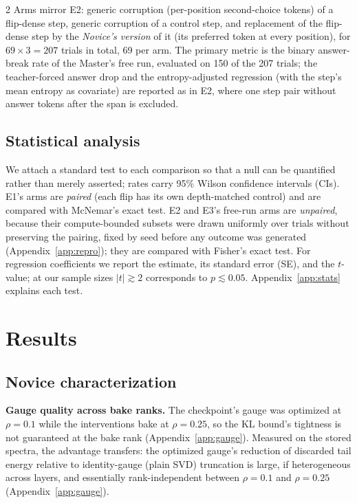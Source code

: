 \documentclass[9pt]{article}
\begin{document}
\begin{multicols}{2}
Arms mirror E2: generic
corruption (per-position second-choice tokens) of a flip-dense step, generic
corruption of a control step, and replacement of the flip-dense step by the
\emph{Novice's version} of it (its preferred token at every position), for
$69 \times 3 = 207$ trials in total, 69 per arm. The primary metric is the
binary answer-break rate of the Master's free run, evaluated on 150 of the
207 trials; the teacher-forced answer drop and the entropy-adjusted
regression (with the step's mean entropy as covariate) are reported as in E2,
where one step pair without answer tokens after the span is excluded.

\subsection{Statistical analysis}

We attach a standard test to each comparison so that a null can be
quantified rather than merely asserted; rates carry 95\% Wilson confidence
intervals (CIs). E1's arms are \emph{paired} (each flip has its own
depth-matched control) and are compared with McNemar's exact test. E2 and
E3's free-run arms are \emph{unpaired}, because their compute-bounded
subsets were drawn uniformly over trials without preserving the pairing,
fixed by seed before any outcome was generated (Appendix~\ref{app:repro});
they are compared with Fisher's exact test. For regression coefficients we
report the estimate, its standard error (SE), and the $t$-value; at our
sample sizes $|t| \gtrsim 2$ corresponds to $p \lesssim 0.05$.
Appendix~\ref{app:stats} explains each test.

\section{Results}

\subsection{Novice characterization}\label{sec:characterization}

\textbf{Gauge quality across bake ranks.} The checkpoint's gauge was optimized
at $\rho{=}0.1$ while the interventions bake at $\rho{=}0.25$, so the KL
bound's tightness is not guaranteed at the bake rank
(Appendix~\ref{app:gauge}). Measured on the stored spectra, the advantage
transfers: the optimized gauge's reduction of discarded tail energy relative
to identity-gauge (plain SVD) truncation is large, if heterogeneous across
layers, and essentially rank-independent between $\rho{=}0.1$ and
$\rho{=}0.25$ (Appendix~\ref{app:gauge}).


\end{multicols}
\end{document}
